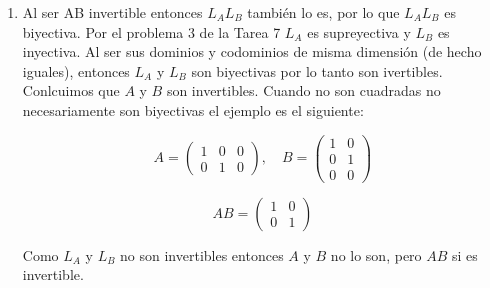 \documentclass[letterpaper]{article}
\theoremstyle{definition}
\theoremstyle{lemathm}
\theoremstyle{lemademthm}
\begin{document}
\begin{enumerate}
		\item Al ser AB invertible entonces $L_AL_B$ también lo es, por lo que $L_AL_B$ es biyectiva. Por el problema 3 de la Tarea 7 $L_A$ es supreyectiva y $L_B$ es inyectiva. Al ser sus dominios y codominios de misma dimensión (de hecho iguales), entonces $L_A$ y $L_B$ son biyectivas por lo tanto son ivertibles. Conlcuimos que $A$ y $B$ son invertibles. Cuando no son cuadradas no necesariamente son biyectivas el ejemplo es el siguiente:
		
		\[A = \begin{pmatrix}
			1 & 0 & 0\\
			0 & 1 & 0
		\end{pmatrix}, \quad B = \begin{pmatrix}
			1 & 0\\
			0 & 1\\
			0 & 0
		\end{pmatrix}\]

		\[AB = \begin{pmatrix}
			1 & 0\\
			0 & 1
		\end{pmatrix}\]

		Como $L_A$ y $L_B$ no son invertibles entonces $A$ y $B$ no lo son, pero $AB$ si es invertible.

    \end{enumerate}
\end{document}

